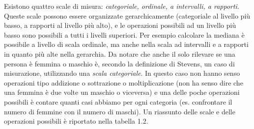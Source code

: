 \documentclass[
  italian,
  letterpaper,
  paper=6in:9in,
  pagesize=pdftex,
  headinclude=on,
  footinclude=on,
  11pt]{scrbook}
\begin{document}
Esistono quattro scale di misura: \emph{categoriale, ordinale, a
intervalli, a rapporti}. Queste scale possono essere organizzate
gerarchicamente (categoriale al livello più basso, a rapporti al livello
più alto), e le operazioni possibili ad un livello più basso sono
possibili a tutti i livelli superiori. Per esempio calcolare la mediana
è possibile a livello di scala ordinale, ma anche nella scala ad
intervalli e a rapporti in quanto più alte nella gerarchia. Da notare
che anche il solo rilevare se una persona è femmina o maschio è, secondo
la definizione di Stevens, un caso di misurazione, utilizzando una
\emph{scala categoriale}. In questo caso non hanno senso operazioni tipo
addizione o sottrazione o moltiplicazione (non ha senso dire che una
femmina è due volte un maschio o viceversa) e una delle poche operazioni
possibili è contare quanti casi abbiamo per ogni categoria (es.
confrontare il numero di femmine con il numero di maschi). Un riassunto
delle scale e delle operazioni possibili è riportato nella tabella 1.2.
\end{document}
